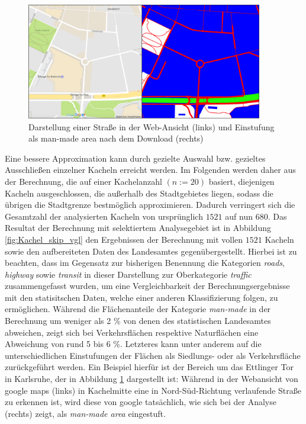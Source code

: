 %
%
\newline
\begin{figure}
  \centering
    \includegraphics[width=0.92\textwidth]{images/3_google_Einstufung_Nutzung.png}
    \caption{Darstellung einer Straße in der Web-Ansicht (links) und Einstufung als man-made area nach dem Download (rechts)}
    \label{fig:versch_nutz_einstuf}
\end{figure}
%
Eine bessere Approximation kann durch gezielte Auswahl bzw. gezieltes Ausschließen einzelner Kacheln erreicht werden. Im Folgenden werden daher aus der Berechnung, die auf einer Kachelanzahl \((n:=20)\) basiert, diejenigen Kacheln ausgeschlossen, die außerhalb des Stadtgebietes liegen, sodass die übrigen die Stadtgrenze bestmöglich approximieren. Dadurch verringert sich die Gesamtzahl der analysierten Kacheln von  ursprünglich \(1521\) auf nun \(680\). Das Resultat der Berechnung mit selektiertem Analysegebiet ist in Abbildung \ref{fig:Kachel_skip_vgl} den Ergebnissen der Berechnung mit vollen \(1521\) Kacheln sowie den aufbereiteten Daten des Landesamtes gegenübergestellt. Hierbei ist zu beachten, dass im Gegensatz zur bisherigen Benennung die Kategorien \textit{roads}, \textit{highway} sowie \textit{transit} in dieser Darstellung zur Oberkategorie \textit{traffic} zusammengefasst wurden, um eine Vergleichbarkeit der Berechnungsergebnisse mit den statisitschen Daten, welche einer anderen Klassifizierung folgen, zu ermöglichen. Während die Flächenanteile der Kategorie \textit{man-made} in der Berechnung um weniger als  \num{2} \% von denen des statistischen Landesamtes abweichen, zeigt sich bei Verkehrsflächen respektive Naturflächen eine Abweichung von rund \num{5} bis \num{6} \%. Letzteres kann unter anderem auf die unterschiedlichen Einstufungen der Flächen als Siedlungs- oder als Verkehrsfläche zurückgeführt werden. Ein Beispiel hierfür ist der Bereich um das Ettlinger Tor in Karlsruhe, der in Abbildung \ref{fig:versch_nutz_einstuf} dargestellt ist: Während in der Webansicht von google maps (links) in Kachelmitte eine in Nord-Süd-Richtung verlaufende Straße zu erkennen ist, wird diese von google tatsächlich, wie sich bei der Analyse (rechts) zeigt, als \textit{man-made area} eingestuft.\\

